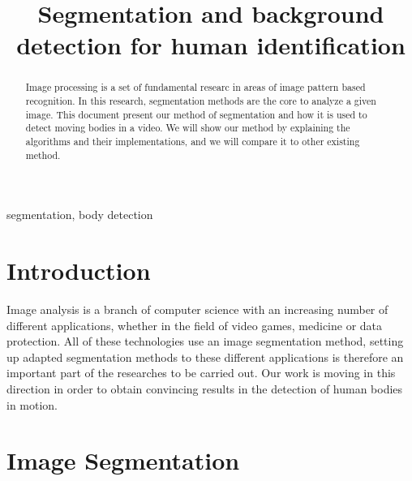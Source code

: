 \documentclass[conference]{IEEEtran}
\begin{document}
\title{Segmentation and background detection for human identification\\
}

\author{
\and
{}
}

\maketitle

\begin{abstract}
Image processing is a set of fundamental researc in areas of image pattern based recognition.
In this research, segmentation methods are the core to analyze a given image.
This document present our method of segmentation and how it is used to detect moving bodies in a video.
We will show our method by explaining the algorithms and their implementations, and we will compare it to other existing method.
\end{abstract}

\begin{IEEEkeywords}
segmentation, body detection
\end{IEEEkeywords}

\section{Introduction}
Image analysis is a branch of computer science with an increasing number of different applications, whether in the field of video games, medicine or data protection. All of these technologies use an image segmentation method, setting up adapted segmentation methods to these different applications is therefore an important part of the researches to be carried out. Our work is moving in this direction in order to obtain convincing results in the detection of human bodies in motion.

\section{Image Segmentation}
\end{document}
